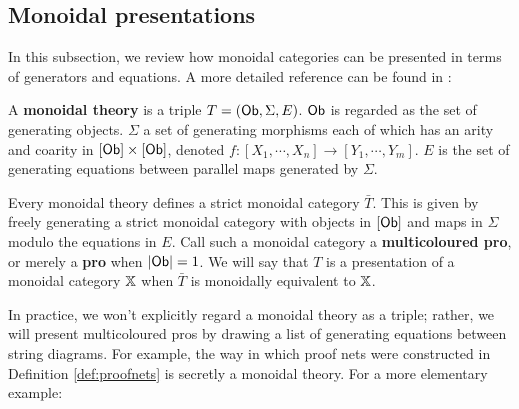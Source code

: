 \subsection{Monoidal presentations}
\label{subsec:monpres}
In this subsection, we review how monoidal categories can be presented in terms of generators and equations. A more detailed reference can be found in \cite{ih}:
\begin{definition}
\label{def:monoidaltheory}
A {\bf monoidal theory} is a triple $T=({\sf Ob},\Sigma ,E )$.   ${\sf Ob}$ is regarded as the set of generating objects. $\Sigma$ a set of generating morphisms each of which has an arity and coarity in $[{\sf Ob}]\times [{\sf Ob}]$, denoted $f:[X_1,\cdots, X_n]\to [Y_1,\cdots, Y_m]$. $E$  is the set of generating equations between parallel maps generated by $\Sigma$.

Every monoidal theory defines a strict monoidal category $\bar T$.  This is given by freely generating a strict monoidal category with objects in  $[\sf Ob]$ and  maps in $\Sigma$ modulo the equations in $E$.  Call such a monoidal category a {\bf multicoloured pro}, or merely a {\bf pro} when $|{\sf Ob}|=1$.  We will say that $T$ is a presentation of a monoidal category $\mathbb{X}$ when $\bar T$ is monoidally equivalent to $\mathbb{X}$.
\end{definition}
 In practice, we won't explicitly regard a  monoidal theory as a triple; rather, we will present multicoloured pros by drawing a list of generating equations between string diagrams.
For example, the way in which proof nets were constructed in Definition \ref{def:proofnets} is secretly a monoidal theory.
For a more elementary example:
